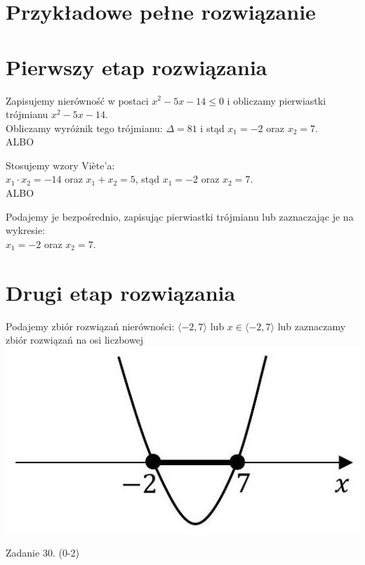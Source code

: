 \documentclass[10pt]{article}
\begin{document}
\section*{Przykładowe pełne rozwiązanie}
\section*{Pierwszy etap rozwiązania}
Zapisujemy nierówność w postaci $x^{2}-5 x-14 \leq 0$ i obliczamy pierwiastki trójmianu $x^{2}-5 x-14$.\\
Obliczamy wyróżnik tego trójmianu: $\Delta=81$ i stąd $x_{1}=-2$ oraz $x_{2}=7$.\\
ALBO

Stosujemy wzory Viète'a:\\
$x_{1} \cdot x_{2}=-14$ oraz $x_{1}+x_{2}=5$, stąd $x_{1}=-2$ oraz $x_{2}=7$.\\
ALBO

Podajemy je bezpośrednio, zapisując pierwiastki trójmianu lub zaznaczając je na wykresie:\\
$x_{1}=-2$ oraz $x_{2}=7$.

\section*{Drugi etap rozwiązania}
Podajemy zbiór rozwiązań nierówności: $\langle-2,7\rangle$ lub $x \in\langle-2,7\rangle$ lub zaznaczamy zbiór rozwiązań na osi liczbowej\\
\includegraphics[max width=\textwidth, center]{2025_02_07_6828143ce1e2fe8e0865g-13}

Zadanie 30. (0-2)
\end{document}
